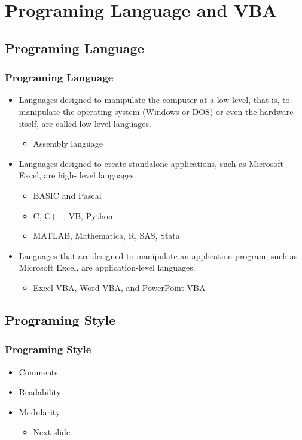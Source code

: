 \documentclass[13pt]{beamer}
\begin{document}
\section{Programing Language and VBA}

\subsection{Programing Language}
\begin{frame}[t]\frametitle{Programing Language}
    \begin{itemize}
    	\item Languages designed to manipulate the computer at a low level, that is, to manipulate the operating system (Windows or DOS) or even the hardware itself, are called low-level languages. 
    	\begin{itemize}
    		\item Assembly language
    	\end{itemize}

    	\item Languages designed to create standalone applications, such as Microsoft Excel, are high- level languages. 
    	\begin{itemize}
    		\item BASIC and Pascal
    		\item C, C++, VB, Python
    		\item MATLAB, Mathematica, R, SAS, Stata
    	\end{itemize} 

    	\item Languages that are designed to manipulate an application program, such as Microsoft Excel, are application-level languages. 
    	\begin{itemize}
    	 	\item Excel VBA, Word VBA, and PowerPoint VBA
    	 \end{itemize} 
    \end{itemize}

\end{frame}

\subsection{Programing Style}
\begin{frame}[t]\frametitle{Programing Style}
	\begin{itemize}
		\item Comments
		\item Readability
		\item Modularity
		\begin{itemize}
			\item Next slide
		\end{itemize}
	\end{itemize}

\end{frame}
\end{document}
